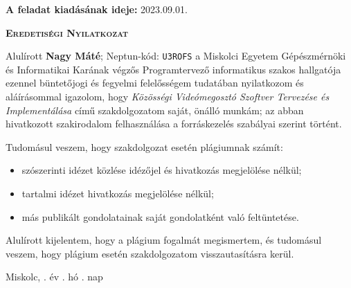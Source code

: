 \bigskip
\noindent\textbf{A feladat kiadásának ideje:} 2023.09.01.


\vspace{1.5cm}

\hfill\makebox[6cm]{\dotfill}

\hfill{}

\clearpage

\vspace*{1cm}
\begin{center}
    \large\textsc{\textbf{Eredetiségi Nyilatkozat}}
\end{center}
\vspace*{2cm}

Alulírott \textbf{Nagy Máté}; Neptun-kód: \texttt{U3ROFS} a Miskolci Egyetem Gépészmérnöki és Informatikai Karának végzős Programtervező informatikus szakos hallgatója ezennel büntetőjogi és fegyelmi felelősségem tudatában nyilatkozom és aláírásommal igazolom, hogy \textit{Közösségi Videómegosztó Szoftver Tervezése és Implementálása}
című szakdolgozatom saját, önálló munkám; az abban hivatkozott szakirodalom
felhasználása a forráskezelés szabályai szerint történt.

\medskip
Tudomásul veszem, hogy szakdolgozat esetén plágiumnak számít:
\begin{itemize}
    \item szószerinti idézet közlése idézőjel és hivatkozás megjelölése nélkül;
    \item tartalmi idézet hivatkozás megjelölése nélkül;
    \item más publikált gondolatainak saját gondolatként való feltüntetése.
\end{itemize}

Alulírott kijelentem, hogy a plágium fogalmát megismertem, és tudomásul veszem, hogy
plágium esetén szakdolgozatom visszautasításra kerül.

\vspace*{3cm}

\noindent Miskolc, \makebox[2cm]{\dotfill}. év \makebox[2cm]{\dotfill}. hó \makebox[2cm]{\dotfill}. nap

\vspace*{3cm}

\hfill\makebox[6cm]{\dotfill}

\hfill{}



\clearpage

